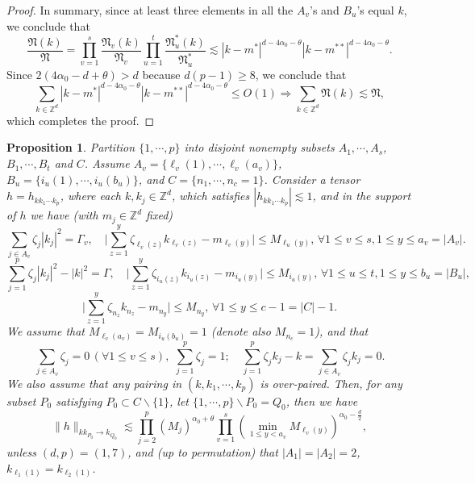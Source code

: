 \documentclass[11 pt,reqno]{amsart}
\newtheorem{prop}[thm]{Proposition}
\theoremstyle{definition}
\theoremstyle{remark}
\numberwithin{equation}{section}
\newcommand{\Zb}{\mathbb{Z}}
\newcommand{\Nf}{\mathfrak{N}}
\begin{document}
{\begin{proof}
In summary, since at least three elements in all the $A_v$'s and $B_u$'s equal $k$, we conclude that
\[\frac{\Nf(k)}{\Nf}=\prod_{v=1}^s\frac{\Nf_v(k)}{\Nf_v}\prod_{u=1}^t\frac{\Nf_u^*(k)}{\Nf_u^*}\lesssim |k-m^*|^{d-4\alpha_0-\theta}|k-m^{**}|^{d-4\alpha_0-\theta}.\] Since $2(4\alpha_0-d+\theta)>d$ because $d(p-1)\geq 8$, we conclude that
\[\sum_{k\in\Zb^d}|k-m^*|^{d-4\alpha_0-\theta}|k-m^{**}|^{d-4\alpha_0-\theta}\leq O(1)\Rightarrow\sum_{k\in\Zb^d}\Nf(k)\lesssim\Nf,\] which completes the proof.
\end{proof}
\begin{prop}\label{final} Partition $\{1,\cdots,p\}$ into disjoint nonempty subsets $A_1,\cdots,A_s$, $B_1,\cdots,B_t$ and $C$. Assume $A_v=\{\ell_v(1),\cdots ,\ell_v(a_v)\}$, $B_u=\{i_u(1),\cdots ,i_u(b_u)\}$, and $C=\{n_1,\cdots, n_c=1\}$. Consider a tensor $h=h_{kk_1\cdots k_p}$, where each $k,k_j\in\Zb^d$, which satisfies $|h_{kk_1\cdots k_p}|\lesssim 1$, and in the support of $h$ we have (with $m_j\in\Zb^d$ fixed)
  \begin{equation}\label{finalset1}\sum_{j\in A_v}\zeta_j|k_j|^2=\Gamma_v,\quad\bigg|\sum_{z=1}^y\zeta_{\ell_v(z)}k_{\ell_v(z)}-m_{\ell_v(y)}\bigg|\leq M_{\ell_u(y)},\,\forall 1\leq v\leq s,1\leq y\leq a_v=|A_v|.
 \end{equation}
   \begin{equation}\label{finalset2}\sum_{j=1}^p\zeta_j|k_j|^2-|k|^2=\Gamma,\quad \bigg|\sum_{z=1}^y\zeta_{i_u(z)}k_{i_u(z)}-m_{i_u(y)}\bigg|\leq M_{i_u(y)},\,\forall 1\leq u\leq t,1\leq y\leq b_u=|B_u|,
 \end{equation}
    \begin{equation}\label{finalset3}\bigg|\sum_{z=1}^y\zeta_{n_z}k_{n_z}-m_{n_y}\bigg|\leq M_{n_y},\,\forall 1\leq y\leq c-1=|C|-1.
 \end{equation} We assume that $M_{\ell_v(a_v)}=M_{i_u(b_u)}=1$ (denote also $M_{n_c}=1$), and that
 \begin{equation}\label{finalset4}\sum_{j\in A_v}\zeta_j=0\,(\forall 1\leq v\leq s),\,\,\sum_{j=1}^p\zeta_j=1;\quad\sum_{j=1}^p\zeta_jk_j-k=\sum_{j\in A_v}\zeta_jk_j=0.\end{equation} We also assume that any pairing in $(k,k_1,\cdots,k_p)$ is over-paired. Then, for any subset $P_0$ satisfying $P_0\subset C\backslash\{1\}$, let $\{1,\cdots,p\}\backslash P_0=Q_0$, then we have
 \begin{equation}\label{finalbound}\|h\|_{kk_{P_0}\to k_{Q_0}}\lesssim \prod_{j=2}^{p}(M_j)^{\alpha_0+\theta}\prod_{v=1}^s(\min_{1\leq y<a_v}M_{\ell_v(y)})^{\alpha_0-\frac{d}{2}},
 \end{equation} \emph{unless} $(d,p)=(1,7)$, and (up to permutation) that $|A_1|=|A_2|=2$, $k_{\ell_1(1)}=k_{\ell_2(1)}$.
 

\end{prop}}
\end{document}
